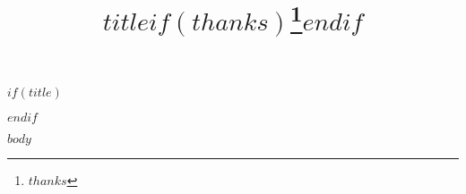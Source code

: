 \documentclass[$if(documentclass)$$documentclass$$else$article$endif$]{$if(class)$$class$$else$scrartcl$endif$}
\title{$title$$if(thanks)$\thanks{$thanks$}$endif$}
\begin{document}
$if(title)$
\maketitle
$endif$

$body$
\end{document}
